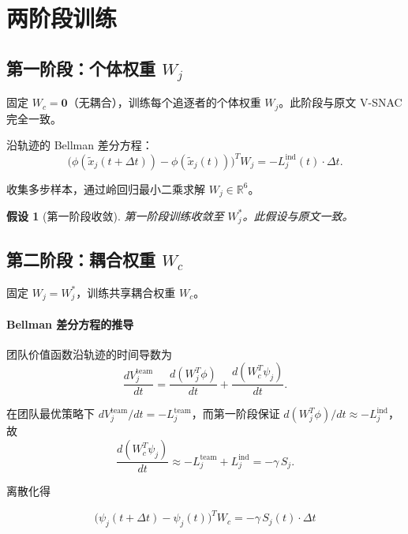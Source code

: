 \documentclass[12pt,a4paper]{ctexart}
\newtheorem{assumption}[theorem]{假设}
\begin{document}
\section{两阶段训练}

\subsection{第一阶段：个体权重 $W_j$}

固定 $W_c = \bm{0}$（无耦合），训练每个追逐者的个体权重 $W_j$。此阶段与原文 V-SNAC 完全一致。

沿轨迹的 Bellman 差分方程：
\begin{equation}\label{eq:bellman-1}
\bigl(\phi(\tilde{x}_j(t+\Delta t)) - \phi(\tilde{x}_j(t))\bigr)^T W_j = -L_j^{\mathrm{ind}}(t) \cdot \Delta t.
\end{equation}

收集多步样本，通过岭回归最小二乘求解 $W_j \in \mathbb{R}^6$。

\begin{assumption}[第一阶段收敛]\label{ass:stage1-converge}
第一阶段训练收敛至 $W_j^*$。此假设与原文一致。
\end{assumption}

\subsection{第二阶段：耦合权重 $W_c$}

固定 $W_j = W_j^*$，训练共享耦合权重 $W_c$。

\paragraph{Bellman 差分方程的推导}
团队价值函数沿轨迹的时间导数为
\[
\frac{dV_j^{\mathrm{team}}}{dt} = \frac{d(W_j^T\phi)}{dt} + \frac{d(W_c^T\psi_j)}{dt}.
\]

在团队最优策略下 $dV_j^{\mathrm{team}}/dt = -L_j^{\mathrm{team}}$，而第一阶段保证 $d(W_j^T\phi)/dt \approx -L_j^{\mathrm{ind}}$，故
\[
\frac{d(W_c^T\psi_j)}{dt} \approx -L_j^{\mathrm{team}} + L_j^{\mathrm{ind}} = -\gamma\,S_j.
\]

离散化得

\begin{equation}\label{eq:bellman-2}
\boxed{
\bigl(\psi_j(t+\Delta t) - \psi_j(t)\bigr)^T W_c = -\gamma\,S_j(t) \cdot \Delta t
}
\end{equation}
\end{document}
